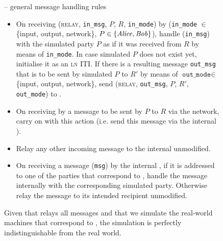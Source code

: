 \begin{figure}[H]
  \begin{simulatorbox}{\simulator{} -- general message handling rules}
    \begin{itemize}
      \item On receiving (\textsc{relay}, \texttt{in\_msg}, $P$, $R$,
      \texttt{in\_mode}) by \fchan (\texttt{in\_mode} $\in$ \{input, output,
      network\}, $P \in \{\mathit{Alice}, \mathit{Bob}\}$), handle (\texttt{in\_msg}) with the
      simulated party $P$ as if it was received from $R$ by means of
      \texttt{in\_mode}. In case simulated $P$ does not exist yet, initialise it
      as an \textsc{ln} ITI. If there is a resulting message \texttt{out\_msg}
      that is to be sent by simulated $P$ to $R'$ by means of
      $\texttt{out\_mode} \in$ \{input, output, network\}, send (\textsc{relay},
      \texttt{out\_msg}, $P$, $R'$, \texttt{out\_mode}) to \fchan.
      \item On receiving by \fchan a message to be sent by $P$ to $R$ via the
      network, carry on with this action (i.e. send this message via the
      internal \adversary).
      \item Relay any other incoming message to the internal \adversary
      unmodified.
      \item On receiving a message (\texttt{msg}) by the internal \adversary, if it is
      addressed to one of the parties that correspond to \fchan, handle the
      message internally with the corresponding simulated party. Otherwise relay
      the message to its intended recipient unmodified. 
    \end{itemize}

    Given that \fchan relays all messages and that we simulate the real-world
    machines that correspond to \fchan, the simulation is perfectly
    indistinguishable from the real world.
  \end{simulatorbox}
  \caption{}
  \label{code:simulator:flow}
\end{figure}

